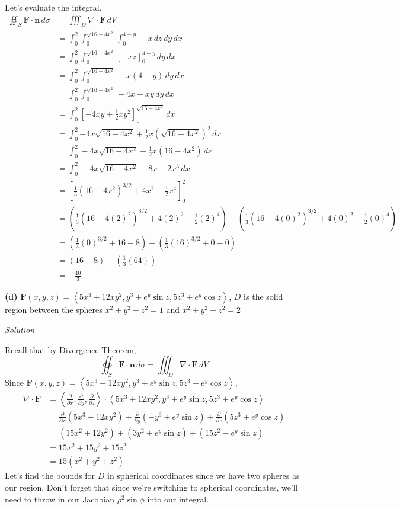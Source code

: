 \documentclass{article}
\newcommand{\lrp}[1]{\left( #1 \right)}
\newcommand{\lra}[1]{\left\langle #1 \right\rangle}
\newcommand{\lrb}[1]{\left[ #1 \right]}
\newcommand{\F}[0]{\mathbf{F}}
\newcommand{\n}[0]{{\mathbf{n}}}
\newcommand{\Solution}{\textit{Solution}}
\begin{document}
Let's evaluate the integral.
\begin{align*}
    \oiint_S \F\cdot \n\,d\sigma &=\iiint_D \nabla \cdot \F\,dV\\
    &=\int_0^2\int_0^{\sqrt{16-4x^2}}\int_0^{4-y}-x\,dz\,dy\,dx\\
    &=\int_0^2\int_0^{\sqrt{16-4x^2}}\lrb{-xz}_0^{4-y}\,dy\,dx\\
    &=\int_0^2\int_0^{\sqrt{16-4x^2}}-x(4-y)\,dy\,dx\\
    &=\int_0^2\int_0^{\sqrt{16-4x^2}}-4x+xy\,dy\,dx\\
    &=\int_0^2\lrb{-4xy+\frac{1}{2}xy^2}_0^{\sqrt{16-4x^2}}\,dx\\
    &=\int_0^2 {-4x\sqrt{16-4x^2}+\frac{1}{2}x\lrp{\sqrt{16-4x^2}}^2}\,dx\\
    &=\int_0^2 -4x\sqrt{16-4x^2}+\frac{1}{2}x(16-4x^2)\,dx\\
    &=\int_0^2 -4x\sqrt{16-4x^2}+ 8x - 2x^3\,dx\\
    &=\lrb{\frac{1}{3}(16-4x^2)^{3/2}+4x^2- \frac{1}{2}x^4}_0^2\\
    &=\lrp{\frac{1}{3}(16-4(2)^2)^{3/2}+4(2)^2-\frac{1}{2}(2)^4}-\lrp{\frac{1}{3}(16-4(0)^2)^{3/2}+4(0)^2-\frac{1}{2}(0)^4}\\
    &=\lrp{\frac{1}{3}(0)^{3/2}+16-8}-\lrp{\frac{1}{3}(16)^{3/2}+0-0}\\
    &=\lrp{16-8}-\lrp{\frac{1}{3}(64)}\\
    &=\boxed{-\frac{40}{3}}\tag{use a calculator}
\end{align*}

{}\textbf{(d)} $\F(x,y,z)=\lra{5x^3+12xy^2,y^3+e^y\sin z, 5z^3+e^y\cos z}$, $D$ is the solid region between the spheres $x^2+y^2+z^2=1$ and $x^2+y^2+z^2=2$

\Solution

Recall that by Divergence Theorem,
\begin{equation*}
    \oiint_S \F\cdot \n \,d\sigma = \iiint_D \nabla \cdot \F\,dV
\end{equation*}
Since $\F(x,y,z)=\lra{5x^3+12xy^2,y^3+e^y\sin z, 5z^3+e^y\cos z}$,
\begin{align*}
    \nabla \cdot \F&=\lra{\frac{\partial }{\partial x},\frac{\partial }{\partial y},\frac{\partial }{\partial z}}\cdot \lra{5x^3+12xy^2,y^3+e^y\sin z, 5z^3+e^y\cos z}\\
    &=\frac{\partial}{\partial x}\lrp{5x^3+12xy^2}+\frac{\partial}{\partial y}\lrp{-y^3+e^y\sin z}+\frac{\partial}{\partial z}\lrp{5z^3+e^y\cos z}\\
    &=\lrp{15x^2+12y^2}+\lrp{3y^2+e^y\sin z}+\lrp{15z^2-e^y\sin z}\\
    &=15x^2+15y^2 + 15z^2\\
    &=15(x^2+y^2+z^2)
\end{align*}
Let's find the bounds for $D$ in spherical coordinates since we have two spheres as our region. Don't forget that since we're switching to spherical coordinates, we'll need to throw in our Jacobian $\rho^2\sin\phi$ into our integral.
\end{document}
